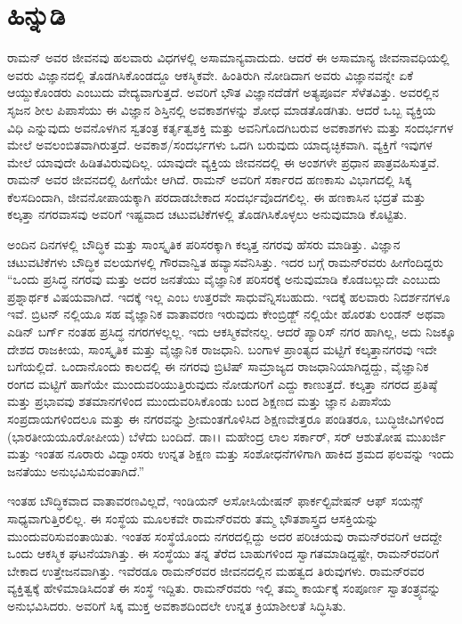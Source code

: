 
\chapter*{ಹಿನ್ನುಡಿ}

ರಾಮನ್ ಅವರ ಜೀವನವು ಹಲವಾರು ವಿಧಗಳಲ್ಲಿ ಅಸಾಮಾನ್ಯವಾದುದು. ಆದರೆ ಈ ಅಸಾಮಾನ್ಯ ಜೀವನಾವಧಿಯಲ್ಲಿ ಅವರು ವಿಜ್ಞಾನದಲ್ಲಿ ತೊಡಗಿಸಿಕೊಂಡದ್ದೂ ಆಕಸ್ಮಿಕವೇ. ಹಿಂತಿರುಗಿ ನೋಡಿದಾಗ ಅವರು ವಿಜ್ಞಾನವನ್ನೇ ಏಕೆ ಆಯ್ದುಕೊಂಡರು ಎಂಬುದು ವೇದ್ಯವಾಗುತ್ತದೆ. ಅವರಿಗೆ ಭೌತ ವಿಜ್ಞಾನದೆಡೆಗೆ ಅತ್ಯಪೂರ್ವ ಸೆಳೆತವಿತ್ತು. ಅವರಲ್ಲಿನ ಸೃಜನ ಶೀಲ ಪಿಪಾಸೆಯು ಈ ವಿಜ್ಞಾನ ಶಿಸ್ತಿನಲ್ಲಿ ಅವಕಾಶಗಳನ್ನು ಶೋಧ ಮಾಡತೊಡಗಿತು. ಆದರೆ ಒಬ್ಬ ವ್ಯಕ್ತಿಯ ವಿಧಿ ಎನ್ನುವುದು ಅವನೊಳಗಿನ ಸ್ವತಂತ್ರ ಕರ್ತೃತ್ವಶಕ್ತಿ ಮತ್ತು ಅವನಿಗೊದಗಿಬರುವ ಅವಕಾಶಗಳು ಮತ್ತು ಸಂದರ್ಭಗಳ ಮೇಲೆ ಅವಲಂಬಿತವಾಗಿರುತ್ತದೆ. ಅವಕಾಶ/ಸಂದರ್ಭಗಳು ಒದಗಿ ಬರುವುದು ಯಾದೃಚ್ಛಿಕವಾಗಿ. ವ್ಯಕ್ತಿಗೆ ಇವುಗಳ ಮೇಲೆ ಯಾವುದೇ ಹಿಡಿತವಿರುವುದಿಲ್ಲ. ಯಾವುದೇ ವ್ಯಕ್ತಿಯ ಜೀವನದಲ್ಲಿ ಈ ಅಂಶಗಳೇ ಪ್ರಧಾನ ಪಾತ್ರವಹಿಸುತ್ತವೆ. ರಾಮನ್ ಅವರ ಜೀವನದಲ್ಲಿ ಹೀಗೆಯೇ ಆಗಿದೆ. ರಾಮನ್ ಅವರಿಗೆ ಸರ್ಕಾರದ ಹಣಕಾಸು ವಿಭಾಗದಲ್ಲಿ ಸಿಕ್ಕ ಕೆಲಸದಿಂದಾಗಿ, ಜೀವನೋಪಾಯಕ್ಕಾಗಿ ಪರದಾಡಬೇಕಾದ ಸಂದರ್ಭವೊದಗಲಿಲ್ಲ. ಈ ಹಣಕಾಸಿನ ಭದ್ರತೆ ಮತ್ತು ಕಲ್ಕತ್ತಾ ನಗರವಾಸವು ಅವರಿಗೆ ಇಷ್ಟವಾದ ಚಟುವಟಿಕೆಗಳಲ್ಲಿ ತೊಡಗಿಸಿಕೊಳ್ಳಲು ಅನುವುಮಾಡಿ ಕೊಟ್ಟಿತು.

ಅಂದಿನ ದಿನಗಳಲ್ಲಿ ಬೌದ್ಧಿಕ ಮತ್ತು ಸಾಂಸ್ಕೃತಿಕ ಪರಿಸರಕ್ಕಾಗಿ ಕಲ್ಕತ್ತ ನಗರವು ಹೆಸರು ಮಾಡಿತ್ತು. ವಿಜ್ಞಾನ ಚಟುವಟಿಕೆಗಳು ಬೌದ್ಧಿಕ ವಲಯಗಳಲ್ಲಿ ಗೌರವಾನ್ವಿತ ಹವ್ಯಾಸವೆನಿಸಿತ್ತು. ಇದರ ಬಗ್ಗೆ ರಾಮನ್‍ರವರು ಹೀಗೆಂದಿದ್ದರು “ಒಂದು ಪ್ರಸಿದ್ಧ ನಗರವು ಮತ್ತು ಅದರ ಜನತೆಯು ವೈಜ್ಞಾನಿಕ ಪರಿಸರಕ್ಕೆ ಅನುವುಮಾಡಿ ಕೊಡಬಲ್ಲುದೇ ಎಂಬುದು ಪ್ರಶ್ನಾರ್ಥಕ ವಿಷಯವಾಗಿದೆ. ಇದಕ್ಕೆ ಇಲ್ಲ ಎಂಬ ಉತ್ತರವೇ ಸಾಧುವೆನ್ನಿಸಬಹುದು. ಇದಕ್ಕೆ ಹಲವಾರು ನಿದರ್ಶನಗಳೂ ಇವೆ. ಬ್ರಿಟನ್ ನಲ್ಲಿಯೂ ಸಹ ವೈಜ್ಞಾನಿಕ ವಾತಾವರಣ ಇರುವುದು ಕೇಂಬ್ರಿಡ್ಜ್ ನಲ್ಲಿಯೇ ಹೊರತು ಲಂಡನ್ ಅಥವಾ ಎಡಿನ್ ಬರ್ಗ್ ನಂತಹ ಪ್ರಸಿದ್ಧ ನಗರಗಳಲ್ಲಲ್ಲ. ಇದು ಆಕಸ್ಮಿಕವೇನಲ್ಲ. ಆದರೆ ಪ್ಯಾರಿಸ್ ನಗರ ಹಾಗಿಲ್ಲ, ಅದು ನಿಜಕ್ಕೂ ದೇಶದ ರಾಜಕೀಯ, ಸಾಂಸ್ಕೃತಿಕ ಮತ್ತು ವೈಜ್ಞಾನಿಕ ರಾಜಧಾನಿ. ಬಂಗಾಳ ಪ್ರಾಂತ್ಯದ ಮಟ್ಟಿಗೆ ಕಲ್ಕತ್ತಾನಗರವು ಇದೇ ಬಗೆಯಲ್ಲಿದೆ. ಒಂದಾನೊಂದು ಕಾಲದಲ್ಲಿ ಈ ನಗರವು ಬ್ರಿಟಿಷ್ ಸಾಮ್ರಾಜ್ಯದ ರಾಜಧಾನಿಯಾಗಿದ್ದದ್ದು, ವೈಜ್ಞಾನಿಕ ರಂಗದ ಮಟ್ಟಿಗೆ ಹಾಗೆಯೇ ಮುಂದುವರಿಯುತ್ತಿರುವುದು ನೋಡುಗರಿಗೆ ಎದ್ದು ಕಾಣುತ್ತದೆ. ಕಲ್ಕತ್ತಾ ನಗರದ ಪ್ರತಿಷ್ಠೆ ಮತ್ತು ಪ್ರಭಾವವು ಶತಮಾನಗಳಿಂದ ಮುಂದುವರಿಸಿಕೊಂಡು ಬಂದ ಶಿಕ್ಷಣದ ಮತ್ತು ಜ್ಞಾನ ಪಿಪಾಸೆಯ ಸಂಪ್ರದಾಯಗಳಿಂದಲೂ ಮತ್ತು ಈ ನಗರವನ್ನು ಶ‍್ರೀಮಂತಗೊಳಿಸಿದ ಶಿಕ್ಷಣವೇತ್ತರೂ ಪಂಡಿತರೂ, ಬುದ್ಧಿಜೀವಿಗಳಿಂದ (ಭಾರತೀಯಯೂರೋಪೀಯ) ಬೆಳೆದು ಬಂದಿದೆ. ಡಾ।। ಮಹೇಂದ್ರ ಲಾಲ ಸರ್ಕಾರ್, ಸರ್ ಆಶುತೋಷ ಮುಖರ್ಜಿ ಮತ್ತು ಇಂತಹ ನೂರಾರು ವಿದ್ವಾಂಸರು ಉನ್ನತ ಶಿಕ್ಷಣ ಮತ್ತು ಸಂಶೋಧನೆಗಳಿಗಾಗಿ ಹಾಕಿದ ಶ್ರಮದ ಫಲವನ್ನು ಇಂದು ಜನತೆಯು ಅನುಭವಿಸುವಂತಾಗಿದೆ.”

ಇಂತಹ ಬೌದ್ಧಿಕವಾದ ವಾತಾವರಣವಿಲ್ಲದೆ, ಇಂಡಿಯನ್ ಅಸೋಸಿಯೇಷನ್ ಫಾರ್\break ಕಲ್ಟಿವೇಷನ್ ಆಫ್ ಸಯನ್ಸ್ ಸಾಧ್ಯವಾಗುತ್ತಿರಲಿಲ್ಲ. ಈ ಸಂಸ್ಥೆಯ ಮೂಲಕವೇ ರಾಮನ್‍ರವರು ತಮ್ಮ ಭೌತಶಾಸ್ತ್ರದ ಆಸಕ್ತಿಯನ್ನು ಮುಂದುವರಿಸುವಂತಾಯಿತು. ಇಂತಹ ಸಂಸ್ಥೆಯೊಂದು ನಗರದಲ್ಲಿದ್ದು ಅದರ ಪರಿಚಯವು ರಾಮನ್‍ರವರಿಗೆ ಆದದ್ದೇ ಒಂದು ಆಕಸ್ಮಿಕ ಘಟನೆಯಾಗಿತ್ತು. ಈ ಸಂಸ್ಥೆಯು ತನ್ನ ತೆರೆದ ಬಾಹುಗಳಿಂದ ಸ್ವಾಗತಮಾಡಿದ್ದಷ್ಟೇ, ರಾಮನ್‍ರವರಿಗೆ ಬೇಕಾದ ಉತ್ತೇಜನವಾಗಿತ್ತು. ಇವೆರಡೂ ರಾಮನ್‍ರವರ ಜೀವನದಲ್ಲಿನ ಮಹತ್ವದ ತಿರುವುಗಳು. ರಾಮನ್‍ರವರ ವ್ಯಕ್ತಿತ್ವಕ್ಕೆ ಹೇಳಿಮಾಡಿಸಿದಂತೆ ಈ ಸಂಸ್ಥೆ ಇದ್ದಿತು. ರಾಮನ್‍ರವರು ಇಲ್ಲಿ ತಮ್ಮ ಕಾರ್ಯಕ್ಕೆ ಸಂಪೂರ್ಣ ಸ್ವಾತಂತ್ರ್ಯವನ್ನು ಅನುಭವಿಸಿದರು. ಅವರಿಗೆ ಸಿಕ್ಕ ಮುಕ್ತ ಅವಕಾಶದಿಂದಲೇ ಉನ್ನತ ಕ್ರಿಯಾಶೀಲತೆ ಸಿದ್ಧಿಸಿತು.

